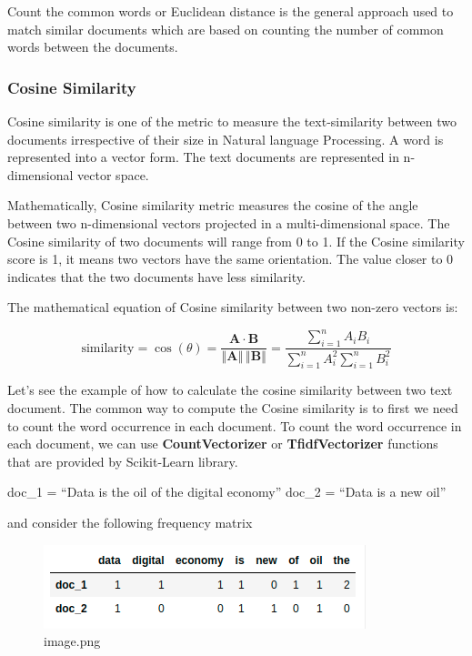 \documentclass[11pt]{article}
\begin{document}
Count the common words or Euclidean distance is the general approach
used to match similar documents which are based on counting the number
of common words between the documents.

    \hypertarget{cosine-similarity}{%
\subsubsection{Cosine Similarity}\label{cosine-similarity}}

    Cosine similarity is one of the metric to measure the text-similarity
between two documents irrespective of their size in Natural language
Processing. A word is represented into a vector form. The text documents
are represented in n-dimensional vector space.

Mathematically, Cosine similarity metric measures the cosine of the
angle between two n-dimensional vectors projected in a multi-dimensional
space. The Cosine similarity of two documents will range from 0 to 1. If
the Cosine similarity score is 1, it means two vectors have the same
orientation. The value closer to 0 indicates that the two documents have
less similarity.

The mathematical equation of Cosine similarity between two non-zero
vectors is:

\begin{equation}
\text{similarity} = \cos(\theta) = \frac{\mathbf{A} \cdot \mathbf{B}}{\left\Vert\mathbf{A}\right\Vert \,\left\Vert\mathbf{B}\right\Vert} = \frac{\sum\limits_{i=1}^n A_iB_i}{\sum\limits_{i=1}^n A_i^2 \sum\limits_{i=1}^n B_i^2}
\end{equation}

Let's see the example of how to calculate the cosine similarity between
two text document. The common way to compute the Cosine similarity is to
first we need to count the word occurrence in each document. To count
the word occurrence in each document, we can use
\textbf{CountVectorizer} or \textbf{TfidfVectorizer} functions that are
provided by Scikit-Learn library.

doc\_1 = ``Data is the oil of the digital economy'' doc\_2 = ``Data is a
new oil''

and consider the following frequency matrix

    \begin{figure}
\centering
\includegraphics{./img/tf-idf-2.png}
\caption{image.png}
\end{figure}
\end{document}
